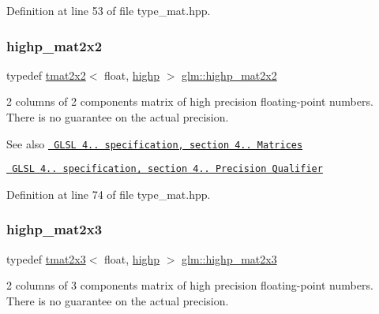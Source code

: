 Definition at line 53 of file type\+\_\+mat.\+hpp.

\mbox{\label{group__core__precision_ga20b66861ebdfa14586f4028c5ef16d2e}} 
\subsubsection{\texorpdfstring{highp\_mat2x2}{highp\_mat2x2}}
{\footnotesize\ttfamily typedef \mbox{\hyperlink{structglm_1_1tmat2x2}{tmat2x2}}$<$ float, \mbox{\hyperlink{namespaceglm_a0f04f086094c747d227af4425893f545ac6f7eab42eacbb10d59a58e95e362074}{highp}} $>$ \mbox{\hyperlink{group__core__precision_ga20b66861ebdfa14586f4028c5ef16d2e}{glm\+::highp\+\_\+mat2x2}}}

2 columns of 2 components matrix of high precision floating-\/point numbers. There is no guarantee on the actual precision.

\begin{DoxySeeAlso}{See also}
\href{http://www.opengl.org/registry/doc/GLSLangSpec.4.20.8.pdf}{\texttt{ G\+L\+SL 4.. specification, section 4.. Matrices}} 

\href{http://www.opengl.org/registry/doc/GLSLangSpec.4.20.8.pdf}{\texttt{ G\+L\+SL 4.. specification, section 4.. Precision Qualifier}} 
\end{DoxySeeAlso}


Definition at line 74 of file type\+\_\+mat.\+hpp.

\mbox{\label{group__core__precision_ga96ec9c154598fcc1c113d9ebd3680097}} 
\subsubsection{\texorpdfstring{highp\_mat2x3}{highp\_mat2x3}}
{\footnotesize\ttfamily typedef \mbox{\hyperlink{structglm_1_1tmat2x3}{tmat2x3}}$<$ float, \mbox{\hyperlink{namespaceglm_a0f04f086094c747d227af4425893f545ac6f7eab42eacbb10d59a58e95e362074}{highp}} $>$ \mbox{\hyperlink{group__core__precision_ga96ec9c154598fcc1c113d9ebd3680097}{glm\+::highp\+\_\+mat2x3}}}

2 columns of 3 components matrix of high precision floating-\/point numbers. There is no guarantee on the actual precision.

